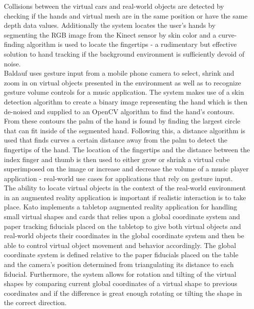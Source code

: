 Collisions between the virtual cars and real-world objects are detected by checking if the hands and virtual mesh are in the same position or have the same depth data values. Additionally the system locates the user's hands by segmenting the RGB image from the Kinect sensor by skin color and a curve-finding algorithm is used to locate the fingertips - a rudimentary but effective solution to hand tracking if the background environment is sufficiently devoid of noise. \\

Baldauf \cite{markerless_ar} uses gesture input from a mobile phone camera to select, shrink and zoom in on virtual objects presented in the environment as well as to recognize gesture volume controls for a music application. The system makes use of a skin detection algorithm to create a binary image representing the hand which is then de-noised and supplied to an OpenCV algorithm to find the hand's contours. From these contours the palm of the hand is found by finding the largest circle that can fit inside of the segmented hand. Following this, a distance algorithm is used that finds curves a certain distance away from the palm to detect the fingertips of the hand. The location of the fingertips and the distance between the index finger and thumb is then used to either grow or shrink a virtual cube superimposed on the image or increase and decrease the volume of a music player application - real-world use cases for applications that rely on gesture input. \\

The ability to locate virtual objects in the context of the real-world environment in an augmented reality application is important if realistic interaction is to take place. Kato \cite{ar_tabletop} implements a tabletop augmented reality application for handling small virtual shapes and cards that relies upon a global coordinate system and paper tracking fiducials placed on the tabletop to give both virtual objects and real-world objects their coordinates in the global coordinate system and then be able to control virtual object movement and behavior accordingly. The global coordinate system is defined relative to the paper fiducials placed on the table and the camera's position determined from triangulating its distance to each fiducial. Furthermore, the system allows for rotation and tilting of the virtual shapes by comparing current global coordinates of a virtual shape to previous coordinates and if the difference is great enough rotating or tilting the shape in the correct direction. \\

